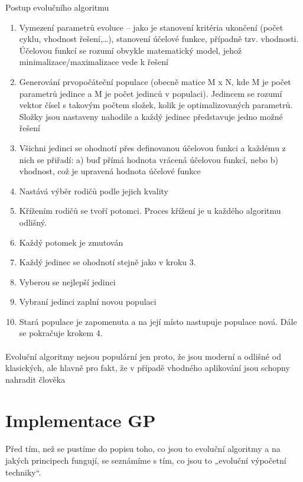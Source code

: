 \documentclass[bc,male,java,dept460]{diploma}		%
\begin{document}
\begin{example}
\label{priklad}
Postup evolučního algoritmu
\begin{enumerate}
\item Vymezení parametrů evoluce – jako je stanovení kritéria ukončení (počet cyklu, vhodnost řešení,…), stanovení účelové funkce, případně tzv. vhodnosti. Účelovou funkcí se rozumí obvykle matematický model, jehož minimalizace/maximalizace vede k řešení
\item Generování prvopočáteční populace (obecně matice M x N, kde M je počet parametrů jedince a M je počet jedinců v populaci). Jedincem se rozumí vektor čísel s takovým počtem složek, kolik je optimalizovaných parametrů. Složky jsou nastaveny nahodile a každý jedinec představuje jedno možné řešení
\item Všichni jedinci se ohodnotí přes definovanou účelovou funkci a každému z nich se přiřadí: a) buď přímá hodnota vrácená účelovou funkcí, nebo b) vhodnost, což je upravená hodnota účelové funkce
\item Nastává výběr rodičů podle jejich kvality
\item Křížením rodičů se tvoří potomci. Proces křížení je u každého algoritmu odlišný.
\item Každý potomek je zmutován
\item Každý jedinec se ohodnotí stejně jako v kroku 3.
\item Vyberou se nejlepší jedinci
\item Vybraní jedinci zaplní novou populaci
\item Stará populace je zapomenuta a na její místo nastupuje populace nová. Dále se pokračuje krokem 4.
\end{enumerate}

\paragraph*{}
Evoluční algoritmy nejsou populární jen proto, že jsou moderní a odlišné od klasických, ale hlavně pro fakt, že v případě vhodného aplikování jsou schopny nahradit člověka
\end{example}

\section{Implementace GP}
\paragraph*{}
Před tím, než se pustíme do popisu toho, co jsou to evoluční algoritmy a na jakých principech fungují, se seznámíme s tím, co jsou to „evoluční výpočetní techniky“.
\end{document}
